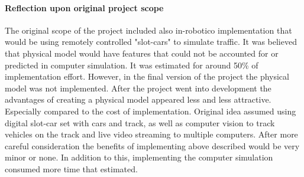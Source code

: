 \documentclass[11pt,english]{article}
\begin{document}

























\paragraph{Reflection upon original project scope}

The original scope of the project included also in-robotico implementation that would be using remotely controlled "slot-cars" to simulate traffic. It was believed that physical model would have features that could not be accounted for or predicted in computer simulation. It was estimated for around 50\% of implementation effort. However, in the final version of the project the physical model was not implemented. After the project went into development the advantages of creating a physical model appeared less and less attractive. Especially compared to the cost of implementation. Original idea assumed using digital slot-car set with cars and track, as well as computer vision to track vehicles on the track and live video streaming to multiple computers. After more careful consideration the benefits of implementing above described would be very minor or none. In addition to this, implementing the computer simulation consumed more time that estimated. 
\end{document}
